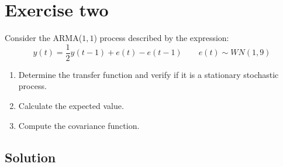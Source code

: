 \section{Exercise two}

Consider the ARMA($1,1$) process described by the expression:
\[y(t)=\dfrac{1}{2}y(t-1)+e(t)-e(t-1) \qquad e(t)\sim WN(1,9)\]
\begin{enumerate}
    \item Determine the transfer function and verify if it is a stationary stochastic process.
    \item Calculate the expected value.
    \item Compute the covariance function.
\end{enumerate}

\subsection*{Solution}
